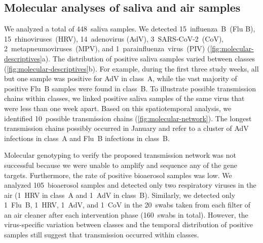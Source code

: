 \documentclass[fleqn,11pt]{wlscirep}
\begin{document}
\subsection{Molecular analyses of saliva and air samples}

We analyzed a total of 448~saliva samples. We detected 15~influenza~B~(Flu B), 15~rhinoviruses~(HRV), 14~adenovirus (AdV), 3~SARS-CoV-2~(CoV), 2~metapneumoviruses~(MPV), and 1~parainfluenza~virus~(PIV) (\cref{fig:molecular-descriptives}a). The distribution of positive saliva samples varied between classes (\cref{fig:molecular-descriptives}b). For example, during the first three study weeks, all but one sample was positive for AdV in class~A, while the vast majority of positive Flu~B samples were found in class~B. To illustrate possible transmission chains within classes, we linked positive saliva samples of the same virus that were less than one week apart. Based on this spatiotemporal analysis, we identified 10~possible transmission chains (\cref{fig:molecular-network}). The longest transmission chains possibly occurred in January and refer to a cluster of AdV infections in class~A and Flu~B infections in class~B. 

Molecular genotyping to verify the proposed transmission network was not successful because we were unable to amplify and sequence any of the gene targets. Furthermore, the rate of positive bioaerosol samples was low. We analyzed 105~bioaerosol samples and detected only two respiratory viruses in the air (1~HRV in class~A and 1~AdV in class~B). Similarly, we detected only 1~Flu~B, 1~HRV, 1~AdV, and 1~CoV in the 20~swabs taken from each filter of an air cleaner after each intervention phase (160~swabs in total). However, the virus-specific variation between classes and the temporal distribution of positive samples still suggest that transmission occurred within classes. 
\end{document}
